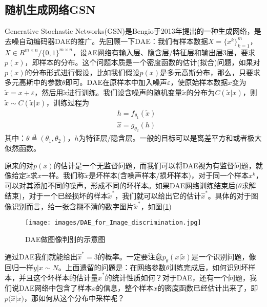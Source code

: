     \subsection{随机生成网络GSN}
        \par
        Generative Stochastic Networks(GSN)是Bengio于2013年提出的一种生成网络，是去噪自动编码器DAE的推广。先回顾一下DAE：我们有样本数据$X=\{x^k\}_{k=1}^m$，$X\in R^{m\times n}/\{0,1\}^{m\times n}$，设AE网络有输入层、隐含层/特征层和输出层3层，要求$p(x)$，即样本的分布。这个问题本质是一个密度函数的估计(拟合)问题，如果对$p(x)$的分布形式进行假设，比如我们假设$p(x)$是多元高斯分布，那么，只要求多元高斯中的参数$\theta$即可。DAE在原样本中加入噪声$\varepsilon$，使原始样本数据$x$变为$\tilde{x} = x+\varepsilon$，然后用$\tilde{x}$进行训练。我们设含噪声的随机变量$\tilde{x}$的分布为$C(\tilde{x}|x)$，则$\tilde{x}\sim C(\tilde{x}|x)$，训练过程为
        \begin{align*}
        & h=f_{\theta_1}(\tilde{x})\\
        & \hat{x}= g_{\theta_2}(h)
        \end{align*}
        其中：$\theta \overset{\Delta}{= } (\theta_1,\theta_2)$，$h$为特征层/隐含层。一般的目标可以是离差平方和或者极大似然函数。
        \par
        原来的对$p(x)$的估计是一个无监督问题，而我们可以将DAE视为有监督问题，就像给定$\tilde{x}$求$x$一样。我们称$\tilde{x}$是坏样本(含噪声样本/损坏样本)，对于同一个样本$x^k$，可以对其添加不同的噪声，形成不同的坏样本。如果DAE网络训练结束后($\theta$求解结束)，对于一个已经损坏的样本$\tilde{x}^*$，我们就可以给出它的估计$\hat{x}^*$。具体的对于图像识别而言，给一张含糊不清的数字图片$\tilde{x}^*$，如图(\ref{fig:DAE做图像判别的示意图})
            \begin{figure}[H]
            \centering
            \texttt{[image: images/DAE\_for\_Image\_discrimination.jpg]}
            \caption{DAE做图像判别的示意图}
            \label{fig:DAE做图像判别的示意图}
            \end{figure}
        通过DAE我们就能给出$\hat{x}^* = 3$的概率。一定要注意$p_\theta(x|\tilde{x})$是一个识别问题，像回归一样$y|x\sim N$。上面遗留的问题是：在网络参数$\theta$训练完成后，如何识别坏样本，并且这个坏样本的估计量$\hat{x}^*$的统计性质如何？对于DAE，还有一个问题，我们说DAE网络中包含了样本$x$的信息，整个样本$x$的密度函数已经估计出来了，即$p(\hat{x}|\tilde{x)}$，那如何从这个分布中采样呢？
        \par
